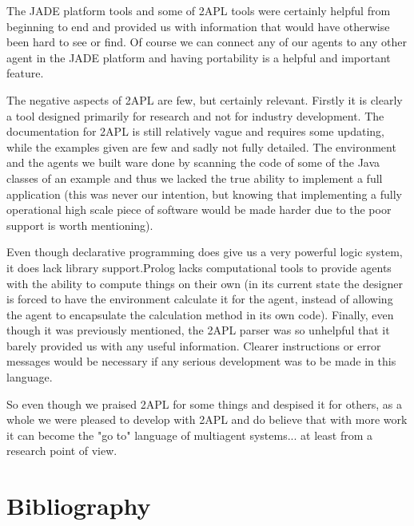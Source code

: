 \documentclass[a4paper]{article}
\begin{document}
The JADE platform tools and some of 2APL tools were certainly helpful from beginning to end and provided us with information that would have otherwise been hard to see or find. Of course we can connect any of our agents to any other agent in the JADE platform and having portability is a helpful and important feature.

The negative aspects of 2APL are few, but certainly relevant. Firstly it is clearly a tool designed primarily for research and not for industry development. The documentation for 2APL is still relatively vague and requires some updating, while the examples given are few and sadly not fully detailed. The environment and the agents we built ware done by scanning the code of some of the Java classes of an example and thus we lacked the true ability to implement a full application (this was never our intention, but knowing that implementing a fully operational high scale piece of software would be made harder due to the poor support is worth mentioning).

Even though declarative programming does give us a very powerful logic system, it does lack library support.Prolog lacks computational tools to provide agents with the ability to compute things on their own (in its current state the designer is forced to have the environment calculate it for the agent, instead of allowing the agent to encapsulate the calculation method in its own code). Finally, even though it was previously mentioned, the 2APL parser was so unhelpful that it barely provided us with any useful information. Clearer instructions or error messages would be necessary if any serious development was to be made in this language.

So even though we praised 2APL for some things and despised it for others, as a whole we were pleased to develop with 2APL and do believe that with more work it can become the "go to" language of multiagent systems... at least from a research point of view.


\section{Bibliography}
\nocite{*}


\end{document}
